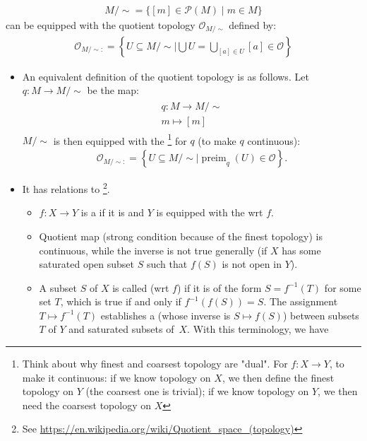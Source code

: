\documentclass{article}
\begin{document}
\begin{enumerate}
\begin{enumerate}
\begin{align*}
M / \sim = \{[m] \in \mathcal{P}(M) \mid m \in M\}
\end{align*}
can be equipped with the quotient topology $\mathcal{O}_{M / \sim}$ defined by:
\begin{align*}
\mathcal{O}_{M / \sim:}=\left\{U \subseteq M / \sim \Bigg| \bigcup U=\bigcup_{[a] \in U}[a] \in \mathcal{O}\right\}
\end{align*}
\begin{itemize}
    \item An equivalent definition of the quotient topology is as follows. Let $q: M \rightarrow M / \sim$ be the map:
\begin{align*}
\begin{gathered}
q: M \rightarrow M / \sim \\
m \mapsto[m]
\end{gathered}
\end{align*}
$M / \sim $ is then equipped with the \footnote{Think about why finest and coarsest topology are "dual". For $f:X\rightarrow Y$, to make it continuous: if we know topology on $X$, we then define the finest topology on $Y$ (the coarsest one is trivial); if we know topology on $Y$, we then need the coarsest topology on $X$} for $q$ (to make $q$ continuous):
\begin{align*}
\mathcal{O}_{M / \sim:}=\left\{U \subseteq M / \sim \mid \operatorname{preim}_{q}(U) \in \mathcal{O}\right\} .
\end{align*}
\item It has relations to \footnote{See \url{https://en.wikipedia.org/wiki/Quotient_space_(topology)}}. 
\begin{itemize}[$\ast$]
\item {} $f: X\rightarrow Y$ is a  if it is  and $Y$ is equipped with the  \gls{wrt} $f$. 
    \item Quotient map (strong condition because of the finest topology) is continuous, while the inverse is not true generally (if $X$ has some saturated open subset $S$ such that $f(S)$ is not open in $Y$). 
    \item {} {\tiny A subset $S$ of $X$ is called  (\gls{wrt} $f$) if it is of the form $S=f^{-1}(T)$ for some set $T$, which is true if and only if $f^{-1}(f(S))=S$. 
    The assignment $T \mapsto f^{-1}(T)$ establishes a  (whose inverse is $S \mapsto f(S)$) between subsets $T$ of $Y$ and saturated subsets of~$X$.}
    With this terminology, we have 
    

\end{itemize}
\end{itemize}
\end{enumerate}
\end{enumerate}
\end{document}
